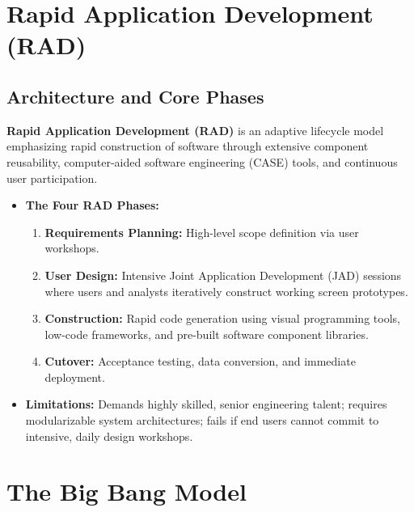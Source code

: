 \section{Rapid Application Development (RAD)}
\label{sec:se_rad_model}

\subsection{Architecture and Core Phases}
\textbf{Rapid Application Development (RAD)} is an adaptive lifecycle model emphasizing rapid construction of software through extensive component reusability, computer-aided software engineering (CASE) tools, and continuous user participation.
\begin{itemize}
    \item \textbf{The Four RAD Phases:}
    \begin{enumerate}
        \item \textbf{Requirements Planning:} High-level scope definition via user workshops.
        \item \textbf{User Design:} Intensive Joint Application Development (JAD) sessions where users and analysts iteratively construct working screen prototypes.
        \item \textbf{Construction:} Rapid code generation using visual programming tools, low-code frameworks, and pre-built software component libraries.
        \item \textbf{Cutover:} Acceptance testing, data conversion, and immediate deployment.
    \end{enumerate}
    \item \textbf{Limitations:} Demands highly skilled, senior engineering talent; requires modularizable system architectures; fails if end users cannot commit to intensive, daily design workshops.
\end{itemize}

\section{The Big Bang Model}
\label{sec:se_big_bang}

